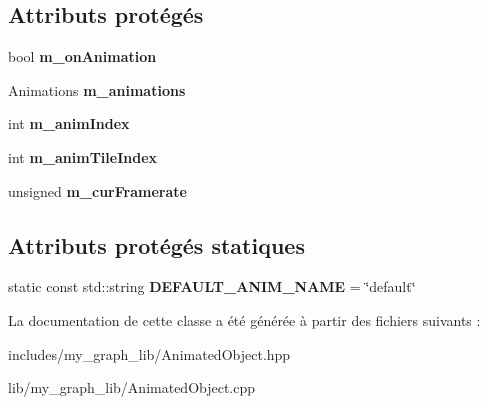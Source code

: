 \subsection*{Attributs protégés}
\begin{DoxyCompactItemize}
\item 
\mbox{\label{classmy_1_1AnimatedObject_adc14c5e8effd46c532ca02127ba1a189}} 
bool {\bfseries m\+\_\+on\+Animation}
\item 
\mbox{\label{classmy_1_1AnimatedObject_a553266e96f728842249f960687d094b9}} 
Animations {\bfseries m\+\_\+animations}
\item 
\mbox{\label{classmy_1_1AnimatedObject_a0a660f4d34009beb751bb8d8d16652af}} 
int {\bfseries m\+\_\+anim\+Index}
\item 
\mbox{\label{classmy_1_1AnimatedObject_a1b115d7e8e1919079b669c87466f56a2}} 
int {\bfseries m\+\_\+anim\+Tile\+Index}
\item 
\mbox{\label{classmy_1_1AnimatedObject_a49fddef498a3975e4846cf093e83e41f}} 
unsigned {\bfseries m\+\_\+cur\+Framerate}
\end{DoxyCompactItemize}
\subsection*{Attributs protégés statiques}
\begin{DoxyCompactItemize}
\item 
\mbox{\label{classmy_1_1AnimatedObject_a561669375b8ea9b5be6309c04be3056b}} 
static const std\+::string {\bfseries D\+E\+F\+A\+U\+L\+T\+\_\+\+A\+N\+I\+M\+\_\+\+N\+A\+ME} = \char`\"{}default\char`\"{}
\end{DoxyCompactItemize}


La documentation de cette classe a été générée à partir des fichiers suivants \+:\begin{DoxyCompactItemize}
\item 
includes/my\+\_\+graph\+\_\+lib/Animated\+Object.\+hpp\item 
lib/my\+\_\+graph\+\_\+lib/Animated\+Object.\+cpp\end{DoxyCompactItemize}
